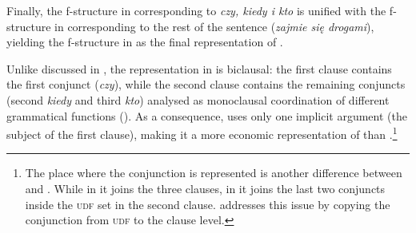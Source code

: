 \documentclass[output=paper]{../langscibook}
\begin{document}
Finally, the f-structure in
 corresponding to
\emph{czy, kiedy i kto} is unified with the f-structure in
 corresponding to the rest of
the sentence (\emph{zajmie się dro\-ga\-mi}), yielding the f-structure in
 as the
final representation of .

Unlike  discussed in
, the representation in
 is biclausal: the
first clause contains the first conjunct (\emph{czy}), while the
second clause contains the remaining conjuncts (second \emph{kiedy} and third
\emph{kto}) analysed as monoclausal
coordination of different grammatical functions (). As a consequence,
 uses only one implicit
argument (the subject of the first clause), making it a more economic
representation of  than
.\footnote{The place where the conjunction is
  represented is another difference between  and
  . While in  it
  joins the three clauses, in  it joins the last
  two conjuncts inside the \textsc{udf} set in the second
  clause. \citet[131]{Patejuk2015} addresses this issue by copying the
  conjunction from \textsc{udf} to the clause level.}
\end{document}
